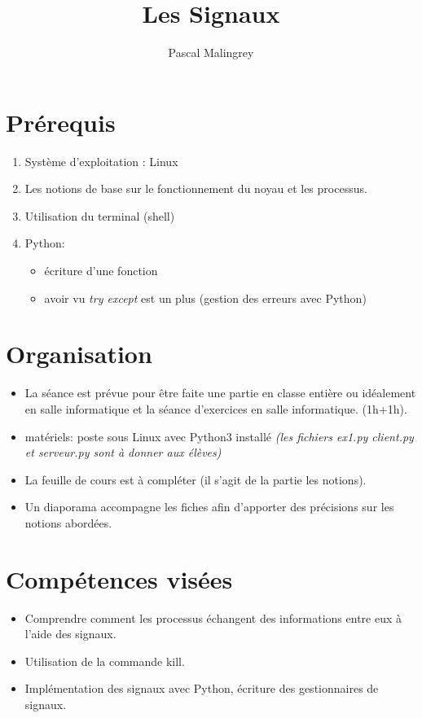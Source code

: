 \documentclass[10pt,french,A4]{article}
\title{Les Signaux}
\author{Pascal Malingrey}
\date{}
\theoremstyle{plain}
\begin{document}

  \ifProf
\section*{Prérequis}
\begin{enumerate}
    \item Système d'exploitation : Linux
    \item Les notions de base sur le fonctionnement du noyau et les processus.
    \item Utilisation du  terminal (shell)
    \item Python: 
    \begin{itemize}
        \item écriture d'une fonction
        \item avoir vu \textit{try except} est un plus (gestion des erreurs avec Python)
    \end{itemize}
\end{enumerate}
\section*{Organisation}
\begin{itemize}
\item La séance est prévue pour être faite une partie en classe entière ou idéalement en salle informatique et la séance d'exercices en salle informatique. (1h+1h). 
\item matériels: poste sous Linux avec Python3 installé \textit{(les fichiers ex1.py client.py et serveur.py sont à donner aux élèves)}
\item La  feuille de cours est à compléter (il s'agit de la partie les notions).
\item Un diaporama accompagne les fiches afin d'apporter des précisions sur les notions abordées.
\end{itemize}
\section*{Compétences visées}
\begin{itemize}
    \item Comprendre comment  les processus échangent des informations entre eux à l'aide des signaux.
    \item Utilisation de la commande kill.
    \item Implémentation des signaux avec Python, écriture des gestionnaires de signaux.
\end{itemize}
\end{document}
